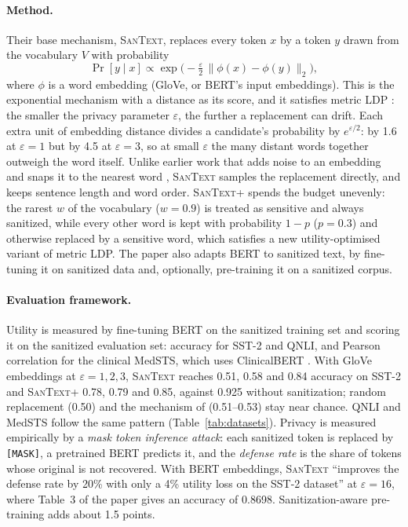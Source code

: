 \documentclass[11pt]{article}
\newcommand{\santext}{\textsc{SanText}}
\newcommand{\santextp}{\textsc{SanText}+}
\begin{document}
\paragraph{Method.} Their base mechanism, \santext{}, replaces every token $x$ by a token $y$ drawn from the vocabulary $V$ with probability
\begin{equation}
  \Pr[y \mid x] \propto \exp\!\big(-\tfrac{\varepsilon}{2}\, \lVert \phi(x)-\phi(y) \rVert_2\big),
  \label{eq:santext}
\end{equation}
where $\phi$ is a word embedding (GloVe, or BERT's input embeddings). This is the exponential mechanism \citep{mcsherry2007mechanism} with a distance as its score, and it satisfies metric LDP \citep{chatzikokolakis2013broadening}: the smaller the privacy parameter $\varepsilon$, the further a replacement can drift. Each extra unit of embedding distance divides a candidate's probability by $e^{\varepsilon/2}$: by 1.6 at $\varepsilon = 1$ but by 4.5 at $\varepsilon = 3$, so at small $\varepsilon$ the many distant words together outweigh the word itself. Unlike earlier work that adds noise to an embedding and snaps it to the nearest word \citep{feyisetan2020privacy}, \santext{} samples the replacement directly, and keeps sentence length and word order. \santextp{} spends the budget unevenly: the rarest $w$ of the vocabulary ($w=0.9$) is treated as sensitive and always sanitized, while every other word is kept with probability $1-p$ ($p=0.3$) and otherwise replaced by a sensitive word, which satisfies a new utility-optimised variant of metric LDP. The paper also adapts BERT to sanitized text, by fine-tuning it on sanitized data and, optionally, pre-training it on a sanitized corpus.

\paragraph{Evaluation framework.} Utility is measured by fine-tuning BERT on the sanitized training set and scoring it on the sanitized evaluation set: accuracy for SST-2 and QNLI, and Pearson correlation for the clinical MedSTS, which uses ClinicalBERT \citep{alsentzer-etal-2019-publicly}. With GloVe embeddings at $\varepsilon = 1, 2, 3$, \santext{} reaches 0.51, 0.58 and 0.84 accuracy on SST-2 and \santextp{} 0.78, 0.79 and 0.85, against 0.925 without sanitization; random replacement (0.50) and the mechanism of \citet{feyisetan2020privacy} (0.51--0.53) stay near chance. QNLI and MedSTS follow the same pattern (Table~\ref{tab:datasets}). Privacy is measured empirically by a \emph{mask token inference attack}: each sanitized token is replaced by \texttt{[MASK]}, a pretrained BERT predicts it, and the \emph{defense rate} is the share of tokens whose original is not recovered. With BERT embeddings, \santext{} ``improves the defense rate by 20\% with only a 4\% utility loss on the SST-2 dataset'' at $\varepsilon = 16$, where Table~3 of the paper gives an accuracy of 0.8698. Sanitization-aware pre-training adds about 1.5 points.
\end{document}
